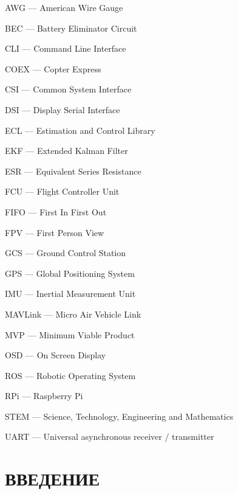 \documentclass[a4paper,12pt]{article}
\begin{document}
AWG --- American Wire Gauge

BEC --- Battery Eliminator Circuit

CLI --- Command Line Interface

COEX --- Copter Express

CSI --- Common System Interface

DSI --- Display Serial Interface

ECL --- Estimation and Control Library

EKF --- Extended Kalman Filter

ESR --- Equivalent Series Resistance

FCU --- Flight Controller Unit

FIFO --- First In First Out

FPV --- First Person View

GCS --- Ground Control Station

GPS --- Global Positioning System

IMU --- Inertial Measurement Unit

MAVLink --- Micro Air Vehicle Link

MVP --- Minimum Viable Product

OSD --- On Screen Display

ROS --- Robotic Operating System

RPi --- Raspberry Pi

STEM --- Science, Technology, Engineering and Mathematics

UART --- Universal asynchronous receiver / transmitter


\pagebreak
{}
\tableofcontents

\thispagestyle{empty} %
\pagebreak

\setcounter{page}{3}
\section*{\centering ВВЕДЕНИЕ}
\pagebreak
\pagebreak
\pagebreak
\pagebreak
\pagebreak
\pagebreak

\end{document}

